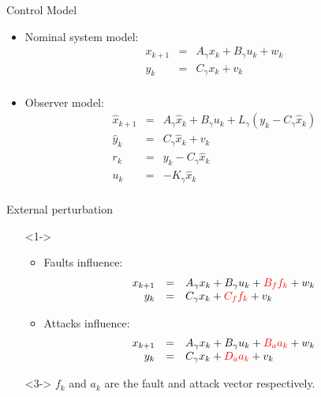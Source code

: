 \documentclass{beamer}
\def\itemizespace{\vspace{3mm}}
\begin{document}
\begin{frame}{Control Model}
	\begin{itemize}
		\item \alert<+>
		{
			Nominal system model:
			\[
				\begin{array}{rcl}
					x_{k+1}	& =	& A_\gamma x_k + B_\gamma u_k + w_k \\
					y_k		& =	& C_\gamma x_k + v_k \\
				\end{array} 
			\]
		}

		\itemizespace

		\item \alert<+>
		{
			Observer model:
			\[
				\begin{array}{rcl}
					\hat{x}_{k+1}	& =	& A_\gamma \hat{x}_k + B_\gamma u_k + L_\gamma (y_k - C_\gamma \hat{x}_k ) \\
					\hat{y}_k		& =	& C_\gamma \hat{x}_k + v_k	\\
					r_k				& = & y_k - C_\gamma \hat{x}_k	\\
					u_k				& = & -K_\gamma \hat{x}_k		\\
				\end{array} 
			\]
		}
	\end{itemize}
\end{frame}

\begin{frame}{External perturbation}
	\begin{itemize}
		\item[]<1->
		{
		\begin{itemize}
				\item \alert<+>
				{
					Faults influence:
					\[
						\begin{array}{rcl}
							x_{k+1}	& =	& A_\gamma x_k + B_\gamma u_k + \textcolor{red}{B_f f_k} + w_k \\
							y_k		& =	& C_\gamma x_k + \textcolor{red}{C_f f_k} + v_k \\
						\end{array} 
					\]
				}

				\itemizespace

				\item \alert<+>
				{
					Attacks influence:
					\[
						\begin{array}{rcl}
							x_{k+1}	& =	& A_\gamma x_k + B_\gamma u_k + \textcolor{red}{B_a a_k} + w_k \\
							y_k		& =	& C_\gamma x_k + \textcolor{red}{D_a a_k} + v_k \\
						\end{array} 
					\]
				}

			\end{itemize}
		}
		\item[]<3-> \alert {\small $f_k$ and $a_k$ are the fault and attack vector respectively.}
	\end{itemize}
\end{frame}
\end{document}
